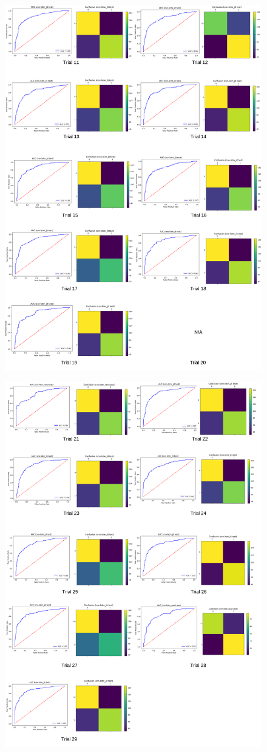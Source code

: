 \documentclass[format=sigconf, nonacm=true, review=true, screen=true]{acmart}
\begin{document}
\begin{figure}
    \centering
    \includegraphics[width=0.9\columnwidth]{figures/cnn-lstm_2.png}
    \label{fig:cnn-lstm_2}
\end{figure}
\begin{figure}
    \centering
    \includegraphics[width=0.9\columnwidth]{figures/cnn-lstm_3.png}
    \label{fig:cnn-lstm_3}
\end{figure}
\end{document}
